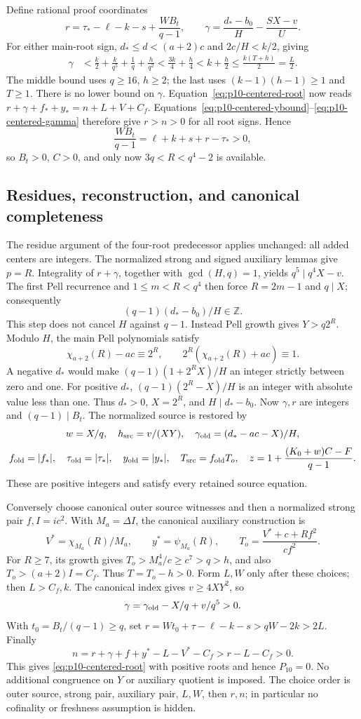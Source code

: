 Define rational proof coordinates
\[
 r=\tau_*-\ell-k-s+\frac{WB_t}{q-1},\qquad
 \gamma=\frac{d_*-b_0}{H}-\frac{SX-v}{U}.
\]
For either main-root sign, $d_*\le d<(a+2)c$ and $2c/H<k/2$, giving
\begin{align}
 \gamma
 &<\frac{k}{2}+\frac{k}{q^5}+\frac1q+\frac{h}{q^2}
 <\frac{3k}{4}+\frac h4
 <k+\frac h2\le\frac{k(T+h)}2=\frac L2.
 \label{eq:p10-centered-gamma}
\end{align}
The middle bound uses $q\ge16$, $h\ge2$; the last uses
$(k-1)(h-1)\ge1$ and $T\ge1$. There is no lower bound on $\gamma$.
Equation~\eqref{eq:p10-centered-root} now reads
$r+\gamma+f_*+y_*=n+L+V+C_f$.
Equations~\eqref{eq:p10-centered-ybound}--\eqref{eq:p10-centered-gamma}
therefore give $r>n>0$ for all root signs. Hence
\[
 \frac{WB_t}{q-1}=\ell+k+s+r-\tau_*>0,
\]
so $B_t>0$, $C>0$, and only now $3q<R<q^4-2$ is available.

\subsection{Residues, reconstruction, and canonical completeness}

The residue argument of the four-root predecessor applies unchanged:
all added centers are integers. The normalized strong and signed auxiliary
lemmas give $p=R$. Integrality of $r+\gamma$, together with
$\gcd(H,q)=1$, yields $q^5\mid q^4X-v$. The first Pell recurrence and
$1\le m<R<q^4$ then force $R=2m-1$ and $q\mid X$; consequently
\[
 (q-1)(d_*-b_0)/H\in\mathbb Z.
\]
This step does not cancel $H$ against $q-1$. Instead Pell growth gives
$Y>q2^R$. Modulo $H$, the main Pell polynomials satisfy
\[
 \chi_{a+2}(R)-ac\equiv2^R,\qquad
 2^R(\chi_{a+2}(R)+ac)\equiv1.
\]
A negative $d_*$ would make $(q-1)(1+2^RX)/H$ an integer strictly between
zero and one. For positive $d_*$, $(q-1)(2^R-X)/H$ is an integer with
absolute value less than one. Thus $d_*>0$, $X=2^R$, and $H\mid d_*-b_0$.
Now $\gamma,r$ are integers and $(q-1)\mid B_t$.
The normalized source is restored by
\[
 w=X/q,\quad h_{\rm src}=v/(XY),\quad
 \gamma_{\rm old}=(d_*-ac-X)/H,
\]
\[
 f_{\rm old}=|f_*|,\quad \tau_{\rm old}=|\tau_*|,
 \quad y_{\rm old}=|y_*|,\quad T_{\rm src}=f_{\rm old}T_o,
 \quad z=1+\frac{(K_0+w)C-F}{q-1}.
\]
These are positive integers and satisfy every retained source equation.

Conversely choose canonical outer source witnesses and then a normalized
strong pair $f,I=ic^2$. With $M_a=\Delta I$, the canonical auxiliary
construction is
\[
 V^*=\chi_{M_a}(R)/M_a,\qquad y^*=\psi_{M_a}(R),\qquad
 T_o=\frac{V^*+c+Rf^2}{cf^2}.
\]
For $R\ge7$, its growth gives
$T_o>M_a^4/c\ge c^7>q>h$, and also $T_o>(a+2)I=C_f$.
Thus $T=T_o-h>0$. Form $L,W$ only after these choices; then $L>C_f,k$.
The canonical index gives $v\ge4XY^2$, so
\[
 \gamma=\gamma_{\rm old}-X/q+v/q^5>0.
\]
With $t_0=B_t/(q-1)\ge q$, set
$r=Wt_0+\tau-\ell-k-s>qW-2k>2L$. Finally
\[
 n=r+\gamma+f+y^*-L-V^*-C_f>r-L-C_f>0.
\]
This gives \eqref{eq:p10-centered-root} with positive roots and hence
$P_{10}=0$. No additional congruence on $Y$ or auxiliary quotient is imposed.
The choice order is outer source, strong pair, auxiliary pair, $L,W$, then
$r,n$; in particular no cofinality or freshness assumption is hidden.

